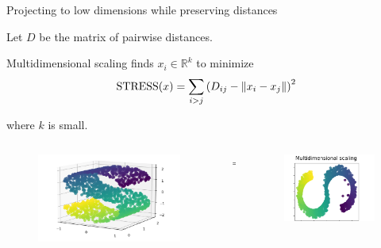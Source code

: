 \documentclass{beamer}
\begin{document}
\begin{frame}{Projecting to low dimensions while preserving distances}

    Let $D$ be the matrix of pairwise distances. 

    Multidimensional scaling finds $x_i \in \mathbb{R}^k$ to minimize 
    \[ 
        \text{STRESS}(\boldmath{x}) = \sum_{i>j} \left(D_{ij} - \lVert x_i - x_j \rVert\right)^2
    \]

    where $k$ is small.

    \begin{columns}
        \begin{column}{0.4\textwidth}
            \begin{figure}
                \includegraphics[width=1.4\textwidth]{standalone/mds_1.png}
                
            \end{figure}   
        \end{column}
        \begin{column}{0.01\textwidth}
            \huge{$\Longrightarrow$}
            
        \end{column}
        \begin{column}{0.4\textwidth}
            \begin{figure}
            \includegraphics[width=\textwidth]{standalone/mds_2.png}
            

\end{figure}
\end{column}
\end{columns}
\end{frame}
\end{document}
